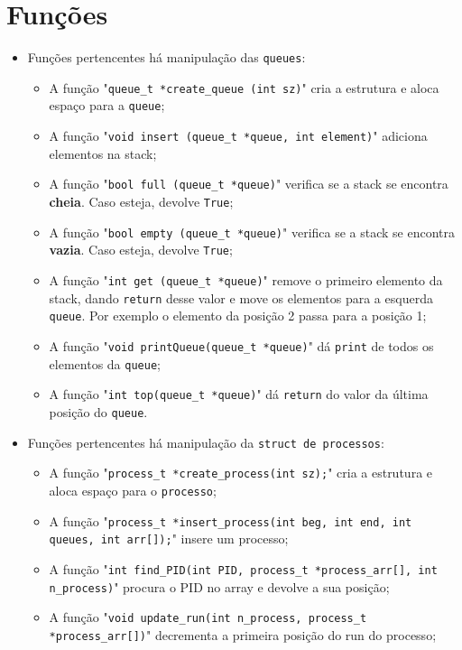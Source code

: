 \documentclass[11pt]{article}   %
\begin{document}
\section{Funções}
\begin{itemize}
    \item Funções pertencentes há manipulação das \verb|queues|:
        \begin{itemize}
            \item A função "\verb|queue_t *create_queue (int sz)|" cria a estrutura e aloca espaço para a \verb|queue|;
            \item A função "\verb|void insert (queue_t *queue, int element)|" adiciona elementos na stack;
            \item A função "\verb|bool full (queue_t *queue)|" verifica se a stack se encontra \textbf{cheia}. Caso esteja, devolve \verb|True|;
            \item A função "\verb|bool empty (queue_t *queue)|" verifica se a stack se encontra \textbf{vazia}. Caso esteja, devolve \verb|True|;
            \item A função "\verb|int get (queue_t *queue)|" remove o primeiro elemento da stack, dando \verb|return| desse valor e move os elementos para a esquerda \verb|queue|. Por exemplo o elemento da posição 2 passa para a posição 1;
            \item A função "\verb|void printQueue(queue_t *queue)|" dá \verb|print| de todos os elementos da \verb|queue|;
            \item A função "\verb|int top(queue_t *queue)|" dá \verb|return| do valor da última posição do \verb|queue|.
        \end{itemize}
    \item Funções pertencentes há manipulação da \verb|struct de processos|:
        \begin{itemize}
            \item A função "\verb|process_t *create_process(int sz);|" cria a estrutura e aloca espaço para o \verb|processo|;
            \item A função "\verb|process_t *insert_process(int beg, int end, int queues, int arr[]);|" \newline insere um processo;
            \item A função "\verb|int find_PID(int PID, process_t *process_arr[], int n_process)|" procura o PID no array e devolve a sua posição;
            \item A função "\verb|void update_run(int n_process, process_t *process_arr[])|" decrementa a primeira posição do run do processo;

\end{itemize}
\end{itemize}
\end{document}
